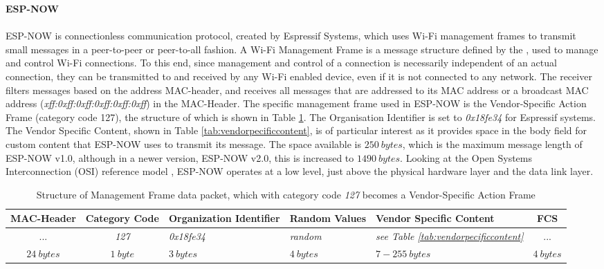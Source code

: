 \textbf{ESP-NOW}\\\\
ESP-NOW is connectionless communication protocol, created by Espressif Systems, which uses Wi-Fi management frames to transmit small messages in a peer-to-peer or peer-to-all fashion. A Wi-Fi Management Frame is a message structure defined by the \citet{noauthor_ieee_2024-1}, used to manage and control Wi-Fi connections. To this end, since management and control of a connection is necessarily independent of an actual connection, they can be transmitted to and received by any Wi-Fi enabled device, even if it is not connected to any network. The receiver filters messages based on the address MAC-header, and receives all messages that are addressed to its MAC address or a broadcast MAC address (\textit{xff:0xff:0xff:0xff:0xff:0xff}) in the MAC-Header. %
The specific management frame used in ESP-NOW is the Vendor-Specific Action Frame (category code 127), the structure of which is shown in Table \ref{tab:managementframe}. The Organisation Identifier is set to \textit{0x18fe34} for Espressif systems. The Vendor Specific Content, shown in Table \ref{tab:vendorpecificcontent}, is of particular interest as it provides space in the body field for custom content that ESP-NOW uses to transmit its message. The space available is $250\ bytes$, which is the maximum message length of ESP-NOW v1.0, although in a newer version, ESP-NOW v2.0, this is increased to $1490\ bytes$. %
Looking at the Open Systems Interconnection (OSI) reference model \citep{zimmermann_osi_1980}, ESP-NOW operates at a low level, just above the physical hardware layer and the data link layer. 

\begin{table}[H]
    \centering
    \begin{tabular}{|c|c|>{\centering\arraybackslash}m{70pt}|>{\centering\arraybackslash}m{60pt}|>{\centering\arraybackslash}m{70pt}|c|}
        \hline
        \textbf{MAC-Header} & \textbf{Category Code} & \textbf{Organization Identifier} & \textbf{Random Values} & \textbf{Vendor Specific Content} & \textbf{FCS} \\
        \hline\hline
        ... & \textit{127} & \textit{0x18fe34} & \textit{random} & \textit{see Table \ref{tab:vendorpecificcontent}} & ... \\
        \hline\hline
        $24\ bytes$ & $1\ byte$ & $3\ bytes$ & $4\ bytes$ & $7-255\ bytes$ & $4\ bytes$ \\
        \hline
    \end{tabular}
    \vspace{\ftspace}
    \caption{Structure of Management Frame data packet, which with category code \textit{127} becomes a Vendor-Specific Action Frame \citep[adapted from][]{espressif_systems_esp-now_nodate}}
    \label{tab:managementframe}
\end{table}

